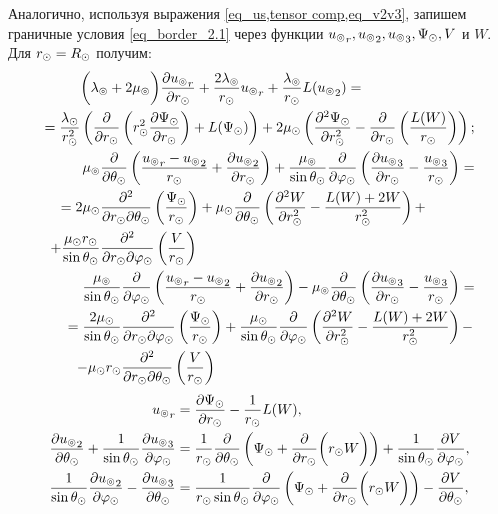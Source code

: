 Аналогично, используя выражения \cref{eq_us,tensor comp,eq_v2v3}, запишем граничные условия \cref{eq_border_2.1} через функции ${u\l}_r, {u\l}_2, {u\l}_3, \P\s, V$ и $W.$ Для $r\s = R\s$ получим:
\begin{align}
\begin{split}
&\biggl(\la\l+2\mu\l\biggr)\fr{\de {u\l}_r}{\de r\s} + \fr{2\la\l}{r\s}{u\l}_r + \fr{\la\l}{r\s}L({u\l}_2) = \\
= \fr{\la\s}{r\s^2}&\left(\fr{\de}{\de r\s}\left(r\s^2\fr{\de\P\s}{\de r\s}\right)+L(\P\s)\right) + 2\mu\s\left(\fr{\de^2 \P\s}{\de r\s^2} - \fr{\de}{\de r\s}\left(\fr{L(W)}{r\s}\right)\right);
\end{split}\label{eq_Rs.1}\\
\begin{split}
\mu\l&\fr{\de}{\de \Q\s}\left(\fr{{u\l}_r-{u\l}_2}{r\s} + \fr{\de {u\l}_2}{\de r\s}\right) + \fr{\mu\l}{\sin\Q\s}\fr{\de}{\de \f\s}\left(\fr{\de {u\l}_3}{\de r\s} - \fr{{u\l}_3}{r\s}\right) = \\
= 2\mu\s&\fr{\de^2}{\de r\s\de\Q\s}\left(\fr{\P\s}{r\s}\right)+ \mu\s\fr{\de}{\de\Q\s}\left(\fr{\de^2 W}{\de r\s^2} - \fr{L(W) + 2W}{r\s^2} \right) + \\
+ \fr{\mu\s r\s}{\sin\Q\s}&\fr{\de^2}{\de r\s\de\f\s}\left(\fr{V}{r\s}\right)
\end{split}\label{eq_Rs.2}\\
\begin{split}
\fr{\mu\l}{\sin\Q\s}&\fr{\de}{\de \f\s}\left(\fr{{u\l}_r-{u\l}_2}{r\s} + \fr{\de {u\l}_2}{\de r\s}\right) - \mu\l\fr{\de}{\de \Q\s}\left(\fr{\de {u\l}_3}{\de r\s} - \fr{{u\l}_3}{r\s}\right) = \\
= \fr{2\mu\s}{\sin\Q\s}&\fr{\de^2}{\de r\s\de\f\s}\left(\fr{\P\s}{r\s}\right)+ \fr{\mu\s}{\sin\Q\s}\fr{\de}{\de\f\s}\left(\fr{\de^2 W}{\de r\s^2} - \fr{L(W) + 2W}{r\s^2} \right) - \\
- \mu\s r\s&\fr{\de^2}{\de r\s\de\Q\s}\left(\fr{V}{r\s}\right)
\end{split}\label{eq_Rs.3}
\end{align}
\begin{align}
{u\l}_r &= \fr{\de \P\s}{\de r\s} - \fr{1}{r\s}L(W),\label{eq_Rs.4}\\
\df{\de {u\l}_2}{\de\Q\s} + \fr1{\sin\Q\s}\fr{\de {u\l}_3}{\de\f\s} &= \fr{1}{r\s}\fr{\de}{\de \Q\s} \left(\P\s + \fr{\de}{\de r\s}\biggl(r\s W\biggr)\right) + \fr{1}{\sin\Q\s}\fr{\de V}{\de\f\s},\label{eq_Rs.5}\\
\df1{\sin\Q\s}\df{\de {u\l}_2}{\de\f\s} - \df{\de {u\l}_3}{\de\Q\s} &= \fr{1}{r\s \sin\Q\s}\fr{\de}{\de \f\s}\left(\P\s + \fr{\de}{\de r\s}\biggl(r\s W\biggr)\right) - \fr{\de V}{\de \Q\s},\label{eq_Rs.6}
\end{align}

